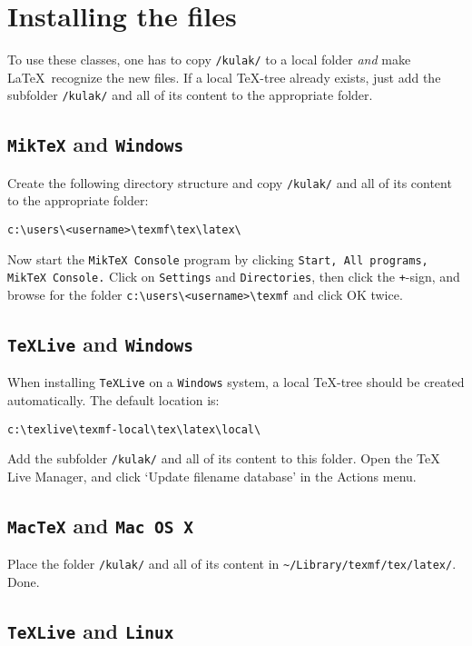 \documentclass[kulak]{kulakarticle} %
\begin{document}
\section{Installing the files}
\label{sec:install}

To use these classes, one has to copy \texttt{/kulak/} to a local folder \emph{and} make \LaTeX\ recognize the new files. If a local \TeX-tree already exists, just add the subfolder \texttt{/kulak/} and all of its content to the appropriate folder.

\subsection{\texttt{MikTeX} and \texttt{Windows}}

Create the following directory structure and copy \texttt{/kulak/} and all of its content to the appropriate folder:
\begin{verbatim}
c:\users\<username>\texmf\tex\latex\
\end{verbatim}
Now start the \texttt{MikTeX Console} program by clicking 
\verb+Start, All programs, MikTeX Console.+
Click on \texttt{Settings} and \texttt{Directories}, then click the \texttt{+}-sign, and browse for the folder \verb+c:\users\<username>\texmf+ and click OK twice.

\subsection{\texttt{TeXLive} and \texttt{Windows}}

When installing \texttt{TeXLive} on a \texttt{Windows} system, a local \TeX-tree should be created automatically. The default location is:
\begin{verbatim}
c:\texlive\texmf-local\tex\latex\local\
\end{verbatim}
Add the subfolder \texttt{/kulak/} and all of its content to this folder. Open the TeX Live Manager, and click `Update filename database' in the Actions menu.


\subsection{\texttt{MacTeX} and \texttt{Mac OS X}}
Place the folder \texttt{/kulak/} and all of its content in \verb+~/Library/texmf/tex/latex/+. Done.

\subsection{\texttt{TeXLive} and \texttt{Linux}}
\end{document}
